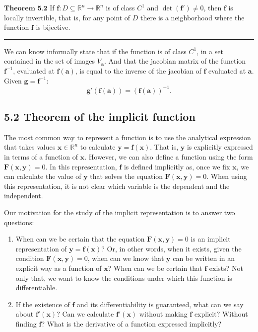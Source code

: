 \documentclass[0pt, a4paper]{article}
\begin{document}
$\textbf{Theorem 5.2}$ If $\textbf{f}:D\subseteq\mathbb{R}^n\to\mathbb{R}^n$ is of class $C^1$ and $\det(\textbf{f}')\neq0$, then $\textbf{f}$ is locally invertible, that is, for any point of $D$ there is a neighborhood where the function $\textbf{f}$ is bijective.


\noindent\rule{\textwidth}{1pt}

We can know informally state that if the function is of class $C^1$, in a set contained in the set of images $V_\textbf{a}$. And that the jacobian matrix of the function $\textbf{f}^{-1}$, evaluated at $\textbf{f}(\textbf{a})$, is equal to the inverse of the jacobian of $\textbf{f}$ evaluated at $\textbf{a}$. Given $\textbf{g}=\textbf{f}^{-1}$:
$$\textbf{g}'(\textbf{f}(\textbf{a}))=\left(\textbf{f}(\textbf{a})\right)^{-1}.$$

\subsection*{5.2 Theorem of the implicit function}

The most common way to represent a function is to use the analytical expression that takes values $\textbf{x}\in\mathbb{R}^n$ to calculate $\textbf{y}=\textbf{f}(\textbf{x}).$ That is, $\textbf{y}$ is explicitly expressed in terms of a function of $\textbf{x}$. However, we can also define a function using the form $\textbf{F}(\textbf{x},\textbf{y})=0$. In this representation, $\textbf{f}$ is defined implicitly as, once we fix $\textbf{x}$, we can calculate the value of $\textbf{y}$ that solves the equation $\textbf{F}(\textbf{x},\textbf{y})=0$. When using this representation, it is not clear which variable is the dependent and the independent.

Our motivation for the study of the implicit representation is to answer two questions:
\begin{enumerate}
	\item When can we be certain that the equation $\textbf{F}(\textbf{x},\textbf{y})=0$ is an implicit representation of $\textbf{y}=\textbf{f}(\textbf{x})$? Or, in other words, when it exists, given the condition $\textbf{F}(\textbf{x},\textbf{y})=0$, when can we know that $\textbf{y}$ can be written in an explicit way as a function of $\textbf{x}$? When can we be certain that $\textbf{f}$ exists? Not only that, we want to know the conditions under which this function is differentiable.
	\item If the existence of $\textbf{f}$ and its differentiability is guaranteed, what can we say about $\textbf{f}'(\textbf{x})$? Can we calculate $\textbf{f}'(\textbf{x})$ without making $\textbf{f}$ explicit? Without finding $\textbf{f}$? What is the derivative of a function expressed implicitly?
\end{enumerate}	
\end{document}
